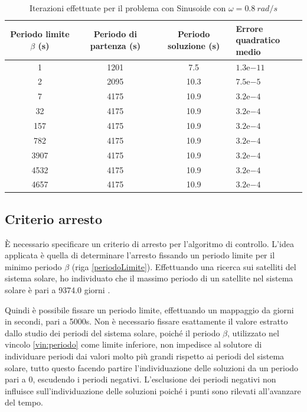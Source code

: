 \documentclass[a4paper,12pt]{report}
\newcommand{\expnumber}[2]{{#1}\mathrm{e}{#2}}
\begin{document}
\begin{table}[H]
  \caption{Iterazioni effettuate per il problema con Sinusoide con $\omega = 0.8~rad/s$}
  \label{tab:init_08}
  \begin{center}
    \begin{tabularx}{\textwidth}{SSSp{0.5\textwidth}}
      \toprule
      {Periodo limite $\beta$ (s)} & {Periodo di partenza (s)} & {Periodo soluzione (s)} & {Errore quadratico \newline medio} \\
       &  1201 & 7.5 & $\expnumber{1.3}{-11}$\\
      2 &  2095 & 10.3 & $\expnumber{7.5}{-5}$\\
      7 &  4175 & 10.9 & $\expnumber{3.2}{-4}$\\
      32 &  4175 & 10.9 & $\expnumber{3.2}{-4}$\\
      157 &  4175 & 10.9 & $\expnumber{3.2}{-4}$\\
      782 &  4175 & 10.9 & $\expnumber{3.2}{-4}$\\
      3907 &  4175 & 10.9 & $\expnumber{3.2}{-4}$\\
      4532 &  4175 & 10.9 & $\expnumber{3.2}{-4}$\\
      4657 &  4175 & 10.9 & $\expnumber{3.2}{-4}$\\
      \bottomrule
    \end{tabularx}
  \end{center}
\end{table}


\subsection{Criterio arresto }
\label{ss:arresto}
È necessario specificare un criterio di arresto per l'algoritmo di controllo. L'idea applicata è quella di determinare l'arresto fissando un periodo limite per il minimo periodo $ \beta $ (riga \ref{periodoLimite}). Effettuando una ricerca sui satelliti del sistema solare, ho individuato che il massimo periodo di un satellite nel sistema solare è pari a 9374.0 giorni \cite{nasa}.

Quindi è possibile fissare un periodo limite, effettuando un mappaggio da giorni in secondi, pari a 5000s.
Non è necessario fissare esattamente il valore estratto dallo studio dei periodi del sistema solare, poiché il periodo $ \beta $, utilizzato nel vincolo \eqref{vin:periodo}  come limite inferiore, non impedisce al solutore di individuare periodi dai valori molto più grandi rispetto ai periodi del sistema solare, tutto questo facendo partire l'individuazione delle soluzioni da un periodo pari a 0, escudendo i periodi negativi. L'esclusione dei periodi negativi non influisce sull'individuazione delle soluzioni poiché i punti sono rilevati all'avanzare del tempo.
\end{document}
